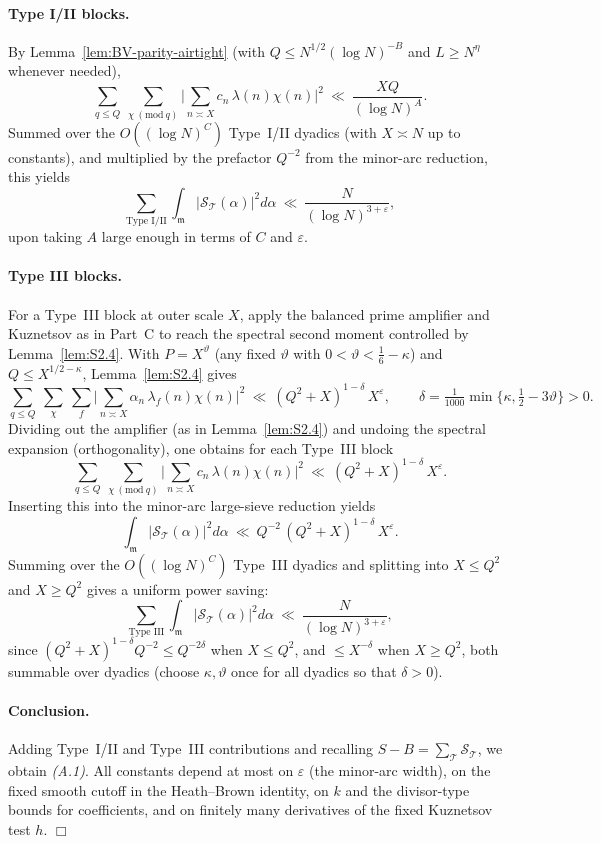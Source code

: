 \documentclass[11pt]{article}
\newcommand{\qedwhite}{\hfill \ensuremath{\Box}}
\theoremstyle{definition}
\theoremstyle{remark}
\numberwithin{equation}{part}
\begin{document}
\paragraph{Type I/II blocks.}
By Lemma~\ref{lem:BV-parity-airtight} (with $Q\le N^{1/2}(\log N)^{-B}$ and $L\ge N^{\eta}$ whenever needed),
\[
	\sum_{q\le Q}\ \sum_{\chi\ (\mathrm{mod}\ q)}
	\Big|\sum_{n\asymp X} c_n\,\lambda(n)\chi(n)\Big|^2
	\ \ll\ \frac{XQ}{(\log N)^{A}}.
\]
Summed over the $O((\log N)^C)$ Type~I/II dyadics (with $X\asymp N$ up to constants), and multiplied by the prefactor $Q^{-2}$ from the minor-arc reduction, this yields
\[
	\sum_{\text{Type I/II}}\int_{\mathfrak m}|\mathcal S_{\mathcal T}(\alpha)|^2 d\alpha
	\ \ll\ \frac{N}{(\log N)^{3+\varepsilon}},
\]
upon taking $A$ large enough in terms of $C$ and $\varepsilon$.

\paragraph{Type III blocks.}
For a Type~III block at outer scale $X$, apply the balanced prime amplifier and Kuznetsov as in Part~C to reach the spectral second moment controlled by Lemma~\ref{lem:S2.4}.
With $P=X^\vartheta$ (any fixed $\vartheta$ with $0<\vartheta<\tfrac16-\kappa$) and $Q\le X^{1/2-\kappa}$, Lemma~\ref{lem:S2.4} gives
\[
	\sum_{q\le Q}\ \sum_{\chi}\ \sum_f
	\Bigg|\sum_{n\asymp X}\alpha_n\,\lambda_f(n)\chi(n)\Bigg|^2
	\ \ll\ (Q^2+X)^{1-\delta}\,X^{\varepsilon},
	\qquad
	\delta=\tfrac{1}{1000}\min\{\kappa,\tfrac12-3\vartheta\}>0.
\]
Dividing out the amplifier (as in Lemma~\ref{lem:S2.4}) and undoing the spectral expansion (orthogonality), one obtains for each Type~III block
\[
	\sum_{q\le Q}\ \sum_{\chi\ (\mathrm{mod}\ q)}
	\Big|\sum_{n\asymp X} c_n\,\lambda(n)\chi(n)\Big|^2
	\ \ll\ (Q^2+X)^{1-\delta}\,X^{\varepsilon}.
\]
Inserting this into the minor-arc large-sieve reduction yields
\[
	\int_{\mathfrak m}|\mathcal S_{\mathcal T}(\alpha)|^2 d\alpha
	\ \ll\ Q^{-2}\,(Q^2+X)^{1-\delta}\,X^{\varepsilon}.
\]
Summing over the $O((\log N)^C)$ Type~III dyadics and splitting into $X\le Q^2$ and $X\ge Q^2$ gives a uniform power saving:
\[
	\sum_{\text{Type III}}\int_{\mathfrak m}|\mathcal S_{\mathcal T}(\alpha)|^2 d\alpha
	\ \ll\ \frac{N}{(\log N)^{3+\varepsilon}},
\]
since $(Q^2+X)^{1-\delta}Q^{-2}\le Q^{-2\delta}$ when $X\le Q^2$, and $\le X^{-\delta}$ when $X\ge Q^2$, both summable over dyadics (choose $\kappa,\vartheta$ once for all dyadics so that $\delta>0$).

\paragraph{Conclusion.}
Adding Type~I/II and Type~III contributions and recalling $S-B=\sum_{\mathcal T}\mathcal S_{\mathcal T}$, we obtain \emph{(A.1)}. All constants depend at most on $\varepsilon$ (the minor-arc width), on the fixed smooth cutoff in the Heath–Brown identity, on $k$ and the divisor-type bounds for coefficients, and on finitely many derivatives of the fixed Kuznetsov test $h$.
\qedwhite
\end{document}
